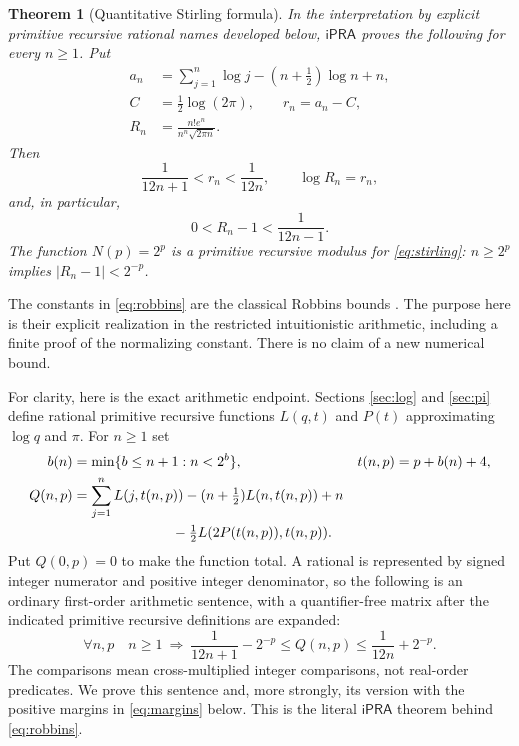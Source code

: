 \documentclass[11pt]{article}
\newtheorem{theorem}{Theorem}[section]
\theoremstyle{definition}
\newcommand{\ipra}{\mathsf{iPRA}}
\newcommand{\abs}[1]{\left|#1\right|}
\begin{document}
\begin{theorem}[Quantitative Stirling formula]\label{thm:main}
In the interpretation by explicit primitive recursive rational names
developed below, $\ipra$ proves the following for every $n\ge1$.
Put
\begin{align}
 a_n&=\sum_{j=1}^n\log j-(n+\tfrac12)\log n+n,\label{eq:a}\\
 C&=\tfrac12\log(2\pi),\qquad r_n=a_n-C,\label{eq:r}\\
 R_n&=\frac{n!e^n}{n^n\sqrt{2\pi n}}.\label{eq:R}
\end{align}
Then
\begin{equation}\label{eq:robbins}
 \frac1{12n+1}<r_n<\frac1{12n},\qquad \log R_n=r_n,
\end{equation}
and, in particular,
\begin{equation}\label{eq:relative}
 0<R_n-1<\frac1{12n-1}.
\end{equation}
The function $N(p)=2^p$ is a primitive recursive modulus for
\eqref{eq:stirling}: $n\ge2^p$ implies $\abs{R_n-1}<2^{-p}$.
\end{theorem}

The constants in \eqref{eq:robbins} are the classical Robbins bounds
\cite{Robbins}. The purpose here is their explicit realization in the
restricted intuitionistic arithmetic, including a finite proof of the
normalizing constant. There is no claim of a new numerical bound.

For clarity, here is the exact arithmetic endpoint. Sections
\ref{sec:log} and \ref{sec:pi} define rational primitive recursive functions
$L(q,t)$ and $P(t)$ approximating $\log q$ and $\pi$. For $n\ge1$ set
\begin{align}
 b(n)&=\min\{b\le n+1:n<2^b\},& t(n,p)&=p+b(n)+4,\label{eq:precision}\\
 Q(n,p)&=\sum_{j=1}^nL(j,t(n,p))
 -(n+\tfrac12)L(n,t(n,p))+n\notag\\
 &\hspace{25mm}-\tfrac12 L(2P(t(n,p)),t(n,p)).\label{eq:Q}
\end{align}
Put $Q(0,p)=0$ to make the function total. A rational is represented by
signed integer numerator and positive integer denominator, so the following
is an ordinary first-order arithmetic sentence, with a quantifier-free
matrix after the indicated primitive recursive definitions are expanded:
\begin{equation}\label{eq:internal}
 \boxed{\quad
 \forall n,p\quad n\ge1\ \Longrightarrow\
 \frac1{12n+1}-2^{-p}\le Q(n,p)
 \le\frac1{12n}+2^{-p}.\quad}
\end{equation}
The comparisons mean cross-multiplied integer comparisons, not real-order
predicates. We prove this sentence and, more strongly, its version with
the positive margins in \eqref{eq:margins} below. This is the literal
$\ipra$ theorem behind \eqref{eq:robbins}.
\end{document}
